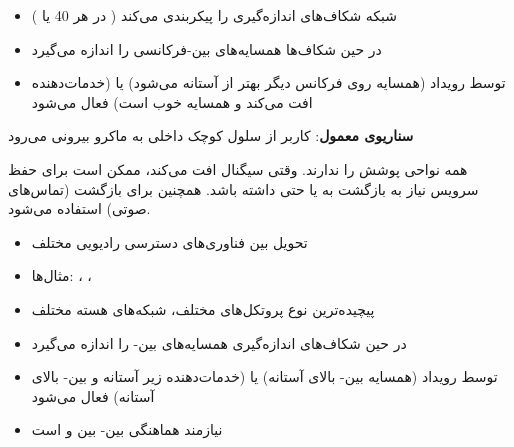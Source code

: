 
\begin{itemize}
\tightlist
\item
  شبکه شکاف‌های اندازه‌گیری را پیکربندی می‌کند ( در هر 40 یا )
\item
   در حین شکاف‌ها همسایه‌های بین-فرکانسی را اندازه می‌گیرد
\item
  توسط رویداد  (همسایه روی فرکانس دیگر بهتر از آستانه می‌شود) یا  (خدمات‌دهنده افت می‌کند و همسایه خوب است) فعال می‌شود
\end{itemize}

\textbf{سناریوی معمول}: کاربر از سلول کوچک داخلی  به ماکرو بیرونی  می‌رود



\CNchained{}

همه نواحی پوشش  را ندارند. وقتی سیگنال  افت می‌کند،  ممکن است برای حفظ سرویس نیاز به بازگشت به  یا حتی  داشته باشد. همچنین برای بازگشت  (تماس‌های صوتی) استفاده می‌شود.


\begin{itemize}
\tightlist
\item
  تحویل بین فناوری‌های دسترسی رادیویی مختلف
\item
  مثال‌ها: ، ، 
\item
  پیچیده‌ترین نوع  پروتکل‌های مختلف، شبکه‌های هسته مختلف
\end{itemize}


\begin{itemize}
\tightlist
\item
   در حین شکاف‌های اندازه‌گیری همسایه‌های بین- را اندازه می‌گیرد
\item
  توسط رویداد  (همسایه بین- بالای آستانه) یا  (خدمات‌دهنده زیر آستانه و بین- بالای آستانه) فعال می‌شود
\item
  نیازمند هماهنگی بین- بین  و  است
\end{itemize}

